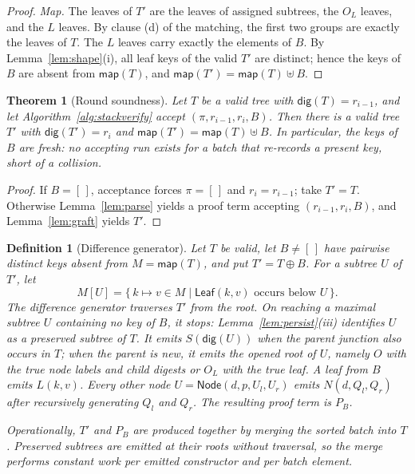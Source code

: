 \documentclass[11pt]{article}
\newtheorem{definition}{Definition}
\newtheorem{theorem}{Theorem}
\begin{document}
\begin{proof}
\emph{Map.} The leaves of $T'$ are the leaves of assigned subtrees, the $O_L$ leaves, and the $L$ leaves. By clause (d) of the matching, the first two groups are exactly the leaves of $T$. The $L$ leaves carry exactly the elements of $B$. By Lemma~\ref{lem:shape}(i), all leaf keys of the valid $T'$ are distinct; hence the keys of $B$ are absent from $\mathsf{map}(T)$, and $\mathsf{map}(T') = \mathsf{map}(T) \uplus B$.
\end{proof}

\begin{theorem}[Round soundness]
\label{thm:round}
Let $T$ be a valid tree with $\mathsf{dig}(T) = r_{i-1}$, and let Algorithm~\ref{alg:stackverify} accept $(\pi, r_{i-1}, r_i, B)$. Then there is a valid tree $T'$ with $\mathsf{dig}(T') = r_i$ and $\mathsf{map}(T') = \mathsf{map}(T) \uplus B$. In particular, the keys of $B$ are fresh: no accepting run exists for a batch that re-records a present key, short of a collision.
\end{theorem}
\begin{proof}
If $B = [\,]$, acceptance forces $\pi = [\,]$ and $r_i = r_{i-1}$; take $T' = T$. Otherwise Lemma~\ref{lem:parse} yields a proof term accepting $(r_{i-1}, r_i, B)$, and Lemma~\ref{lem:graft} yields $T'$.
\end{proof}

\begin{definition}[Difference generator]
\label{def:generator}
Let $T$ be valid, let $B \neq [\,]$ have pairwise distinct keys absent from $M=\mathsf{map}(T)$, and put $T'=T\oplus B$. For a subtree $U$ of $T'$, let
\[
  M[U] = \{\,k \mapsto v \in M \mid \mathsf{Leaf}(k,v)\text{ occurs below }U\,\}.
\]
The difference generator traverses $T'$ from the root. On reaching a maximal subtree $U$ containing no key of $B$, it stops: Lemma~\ref{lem:persist}(iii) identifies $U$ as a preserved subtree of $T$. It emits $S(\mathsf{dig}(U))$ when the parent junction also occurs in $T$; when the parent is new, it emits the opened root of $U$, namely $O$ with the true node labels and child digests or $O_L$ with the true leaf. A leaf from $B$ emits $L(k,v)$. Every other node $U=\mathsf{Node}(d,p,U_l,U_r)$ emits $N(d,Q_l,Q_r)$ after recursively generating $Q_l$ and $Q_r$. The resulting proof term is $P_B$.

Operationally, $T'$ and $P_B$ are produced together by merging the sorted batch into $T$. Preserved subtrees are emitted at their roots without traversal, so the merge performs constant work per emitted constructor and per batch element.
\end{definition}
\end{document}
